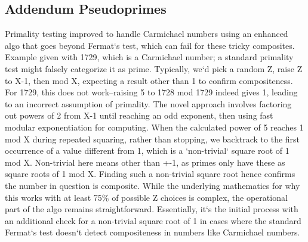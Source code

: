 \subsection*{Addendum  Pseudoprimes}
Primality testing improved to handle Carmichael numbers using an enhanced algo that goes beyond Fermat`s test, which can fail for these tricky composites.
Example given with 1729, which is a Carmichael number; a standard primality test might falsely categorize it as prime.
Typically, we`d pick a random Z, raise Z to X-1, then mod X, expecting a result other than 1 to confirm compositeness.
For 1729, this does not work--raising 5 to 1728 mod 1729 indeed gives 1, leading to an incorrect assumption of primality.
The novel approach involves factoring out powers of 2 from X-1 until reaching an odd exponent, then using fast modular exponentiation for computing.
When the calculated power of 5 reaches 1 mod X during repeated squaring, rather than stopping, we backtrack to the first occurrence of a value different from 1, which is a `non-trivial` square root of 1 mod X\@.
Non-trivial here means other than +-1, as primes only have these as square roots of 1 mod X\@.
Finding such a non-trivial square root hence confirms the number in question is composite.
While the underlying mathematics for why this works with at least 75\% of possible Z choices is complex, the operational part of the algo remains straightforward.
Essentially, it`s the initial process with an additional check for a non-trivial square root of 1 in cases where the standard Fermat`s test doesn`t detect compositeness in numbers like Carmichael numbers.

